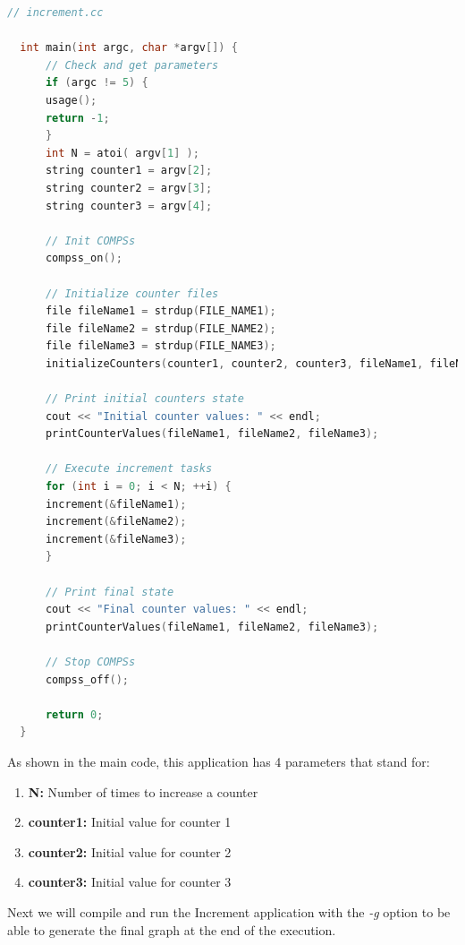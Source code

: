 \begin{lstlisting}[language=c]
  // increment.cc
  
  int main(int argc, char *argv[]) {
      // Check and get parameters
      if (argc != 5) {
	  usage();
	  return -1;
      }
      int N = atoi( argv[1] );
      string counter1 = argv[2];
      string counter2 = argv[3];
      string counter3 = argv[4];

      // Init COMPSs
      compss_on();

      // Initialize counter files
      file fileName1 = strdup(FILE_NAME1);
      file fileName2 = strdup(FILE_NAME2);
      file fileName3 = strdup(FILE_NAME3);
      initializeCounters(counter1, counter2, counter3, fileName1, fileName2, fileName3);

      // Print initial counters state
      cout << "Initial counter values: " << endl;
      printCounterValues(fileName1, fileName2, fileName3);

      // Execute increment tasks
      for (int i = 0; i < N; ++i) {
	  increment(&fileName1);
	  increment(&fileName2);
	  increment(&fileName3);
      }

      // Print final state
      cout << "Final counter values: " << endl;
      printCounterValues(fileName1, fileName2, fileName3);

      // Stop COMPSs
      compss_off();

      return 0;
  }
\end{lstlisting}

As shown in the main code, this application has 4 parameters that stand for:

\begin{enumerate}
 \item \textbf{N:} Number of times to increase a counter
 \item \textbf{counter1:} Initial value for counter 1
 \item \textbf{counter2:} Initial value for counter 2
 \item \textbf{counter3:} Initial value for counter 3
\end{enumerate}

Next we will compile and run the Increment application with the \textit{-g} option to be able to generate the final graph at the end 
of the execution.

